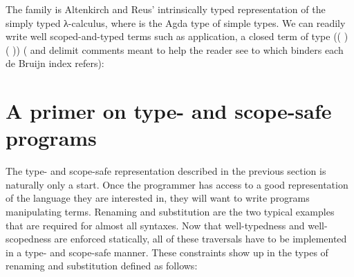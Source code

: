\noindent
\begin{minipage}{0.99\textwidth}
  \begin{minipage}[t]{0.4\textwidth}
  \end{minipage}
  \begin{minipage}[t]{0.59\textwidth}
  \end{minipage}
\end{minipage}

The   family  is Altenkirch and Reus'
intrinsically typed representation of the simply typed λ-calculus,
where  is the Agda type of simple types.  We can readily
write well scoped-and-typed terms such as application, a closed
term of type {((  )  ( 
  ))} (\AC{\{-} and \AC{-\}} delimit comments meant to help the
reader see to which binders each de Bruijn index refers):

\begin{agdasnippet}
\end{agdasnippet}




\section{A primer on type- and scope-safe programs}\label{section:primer-program}

The type- and scope-safe representation described in the previous
section is naturally only a start. Once the programmer has access to a
good representation of the language they are interested in, they will
want to write programs manipulating terms.  Renaming and substitution
are the two typical examples that are required for almost all
syntaxes. Now that well-typedness and well-scopedness are enforced
statically, all of these traversals have to be implemented in a type-
and scope-safe manner.  These constraints show up in the types of
renaming and substitution defined as follows:

\noindent
\begin{minipage}{0.99\textwidth}
\begin{minipage}{0.50\textwidth}
\end{minipage}\hfill
\begin{minipage}{0.49\textwidth}
\end{minipage}
\end{minipage}

